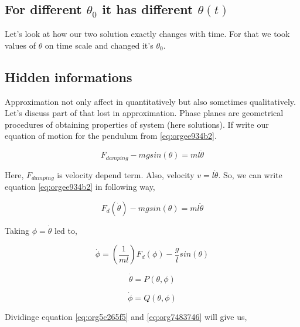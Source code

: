 \documentclass[11pt,a4paper]{article}
\begin{document}
\subsection{For different \(\theta_{0}\) it has different \(\theta(t)\)}
\label{sec:org673677e}

Let's look at how our two solution exactly changes with time. For that we took values of \(\theta\) on time scale and changed it's \(\theta_{0}\).





\subsection{Hidden informations}
\label{sec:orge1fdb9f}

Approximation not only affect in quantitatively but also sometimes qualitatively. Let's discuss part of that lost in approximation. Phase planes are geometrical procedures of obtaining properties of system (here solutions). If write our equation of motion for the pendulum from \ref{eq:orgee934b2}.

\begin{equation*}
\label{eq:org106de76}
F_{damping}-mgsin(\theta)=ml\ddot{\theta}
\end{equation*}

Here, \(F_{damping}\) is velocity depend term. Also, velocity \(v=l\dot{\theta}\). So, we can write equation \ref{eq:orgee934b2} in following way,


\begin{equation*}
\label{eq:orgfc94e10}
F_{d}(\dot{\theta})-mgsin(\theta)=ml\ddot{\theta}
\end{equation*}

Taking \(\phi=\dot{\theta}\) led to,

\begin{equation}
\label{eq:org235eb10}
\dot{\phi}=(\frac{1}{ml})F_{d}(\phi)-\frac{g}{l}sin(\theta)
\end{equation}

\begin{equation}
\label{eq:org7483746}
\dot{\theta} = P(\theta,\phi)
\end{equation}

\begin{equation}
\label{eq:org5c265f5}
\dot{\phi} = Q(\theta,\phi)
\end{equation}

Dividinge equation \ref{eq:org5c265f5} and \ref{eq:org7483746} will give us,
\end{document}
